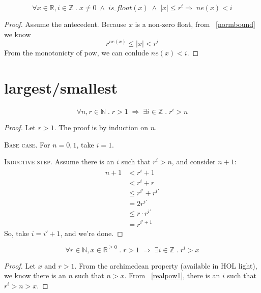 \documentclass{article}
\begin{document}
\begin{lem}
\label{expupper}
\begin{equation*}
\forall x \in \mathbb{R}, i \in \mathbb{Z} \; . 
\; x \neq 0 \; \wedge \; is\_float(x) \; \wedge \; |x| \leq r^i
\Longrightarrow \; ne(x) < i
\end{equation*}
\begin{proof} Assume the antecedent. Because $x$ is a non-zero float,
from ~\ref{normbound} we know
\begin{equation*}
r^{ne(x)} \leq |x| < r^i
\end{equation*}
From the monotonicty of pow, we can conlude $ne(x) < i$.
\end{proof}
\end{lem}

\section{largest/smallest}

\begin{lem}
\label{realpow1}
\begin{equation*}
\forall n, r \in \mathbb{N} \; . \; r > 1 \; \Longrightarrow \;
\exists i \in \mathbb{Z} \; . \; r^i > n
\end{equation*}
\begin{proof} Let $r > 1$. The proof is by induction on $n$.

\textsc{Base case.} For $n = 0, 1$, take $i = 1$.

\textsc{Inductive step.} Assume there is an $i$ such that $r^i > n$, and
consider $n + 1$:
\begin{align*}
n + 1 &< r^i + 1 \tag{induction hyp}\\
&< r^i + r \tag{$r > 1$}\\
&\leq r^{i'} + r^{i'} \tag{$i' = max(i, 1)$, monotonicity of pow}\\
&= 2r^{i'}\\
&\leq r \cdot r^{i'} \tag{$r \geq 2$}\\
&= r^{i' + 1}
\end{align*}
So, take $i = i' + 1$, and we're done.
\end{proof}
\end{lem}

\begin{lem}
\label{realpow2}
\begin{equation*}
\forall r \in \mathbb{N}, x \in \mathbb{R}^{\geq 0} \; . \; r > 1 \; 
\Longrightarrow \; \exists i \in \mathbb{Z} \; . \; r^i > x
\end{equation*}
\begin{proof} Let $x$ and $r > 1$. From the archimedean property (available
in HOL light), we know
there is an $n$ such that $n > x$. From ~\ref{realpow1}, there is an $i$
such that $r^i > n > x$.
\end{proof}
\end{lem}
\end{document}
